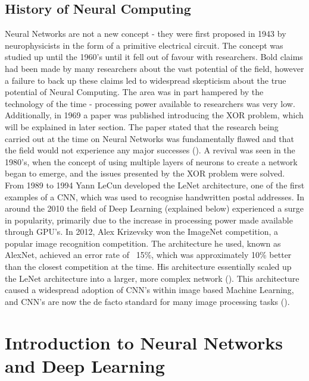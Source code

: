 \documentclass[12pt]{report}
\begin{document}
\subsection{History of Neural Computing}
\begin{flushleft}
Neural Networks are not a new concept - they were first proposed in 1943 by neurophysicists in the form of a primitive electrical circuit. The concept was studied up until the 1960's until it fell out of favour with researchers. Bold claims had been made by many researchers about the vast potential of the field, however a failure to back up these claims led to widespread skepticism about the true potential of Neural Computing. The area was in part hampered by the technology of the time - processing power available to researchers was very low. Additionally, in 1969 a paper was published introducing the XOR problem, which will be explained in later section. The paper stated that the research being carried out at the time on Neural Networks was fundamentally flawed and that the field would not experience any major successes (\cite{minsky1969introduction}). A revival was seen in the 1980's, when the concept of using multiple layers of neurons to create a network began to emerge, and the issues presented by the XOR problem were solved. From 1989 to 1994 Yann LeCun developed the LeNet architecture, one of the first examples of a CNN, which was used to recognise handwritten postal addresses. In around the 2010 the field of Deep Learning (explained below) experienced a surge in popularity, primarily due to the increase in processing power made available through GPU's. In 2012, Alex Krizevsky won the ImageNet competition, a popular image recognition competition. The architecture he used, known as AlexNet, achieved an error rate of ~15\%, which was approximately 10\% better than the closest competition at the time. His architecture essentially scaled up the LeNet architecture into a larger, more complex network (\cite{krizhevsky2012imagenet}). This architecture caused a widespread adoption of CNN's within image based Machine Learning, and CNN's are now the de facto standard for many image processing tasks (\cite{o2015introduction}).
\end{flushleft}

\section{Introduction to Neural Networks and Deep Learning}
\end{document}
